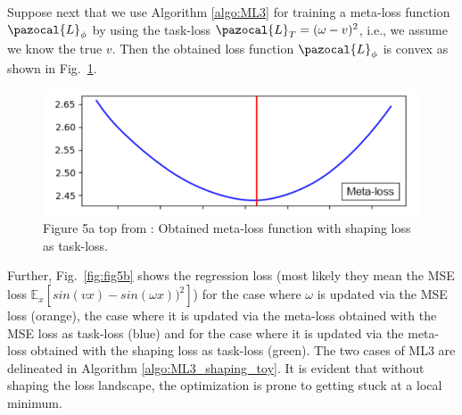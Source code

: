 Suppose next that we use Algorithm \ref{algo:ML3} for training a meta-loss function $\pazocal{L}_{\phi}$ by using the task-loss $\pazocal{L}_{T} = (\omega - v)^2$, i.e., we assume we know the true $v$. 
Then the obtained loss function $\pazocal{L}_{\phi}$ is convex as shown in Fig.~\ref{fig:fig5at}.
\begin{figure}[H]
	\centering
	\includegraphics[width=0.7\linewidth]{./Figures/fig5at.png}
	\caption{Figure 5a top from \textcite{bechtle2020metalearning}: Obtained meta-loss function with shaping loss as task-loss.}
	\label{fig:fig5at}
\end{figure}
Further, Fig.~\ref{fig:fig5b} shows the regression loss (most likely they mean the MSE loss $\mathbb{E}_{x}[sin(vx)-sin(\omega x))^2]$) for the case where $\omega$ is updated via the MSE loss (orange), the case where it is updated via the meta-loss obtained with the MSE loss as task-loss (blue) and for the case where it is updated via the meta-loss obtained with the shaping loss as task-loss (green).
The two cases of ML3 are delineated in Algorithm \ref{algo:ML3_shaping_toy}.
It is evident that without shaping the loss landscape, the optimization is prone to getting stuck at a local minimum.

